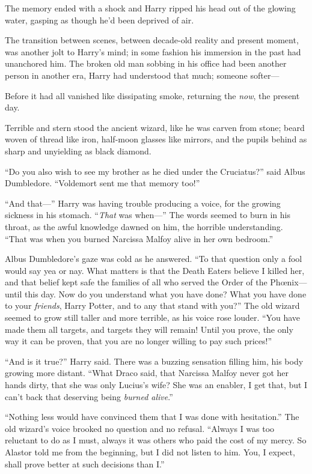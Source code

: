 \later

The memory ended with a shock and Harry ripped his head out of the glowing water, gasping as though he’d been deprived of air.

The transition between scenes, between decade-old reality and present moment, was another jolt to Harry’s mind; in some fashion his immersion in the past had unanchored him. The broken old man sobbing in his office had been another person in another era, Harry had understood that much; someone softer—

Before it had all vanished like dissipating smoke, returning the \emph{now}, the present day.

Terrible and stern stood the ancient wizard, like he was carven from stone; beard woven of thread like iron, half-moon glasses like mirrors, and the pupils behind as sharp and unyielding as black diamond.

“Do you also wish to see my brother as he died under the Cruciatus?” said Albus Dumbledore. “Voldemort sent me that memory too!”

“And that—” Harry was having trouble producing a voice, for the growing sickness in his stomach. “\emph{That} was when—” The words seemed to burn in his throat, as the awful knowledge dawned on him, the horrible understanding. “That was when you burned Narcissa Malfoy alive in her own bedroom.”

Albus Dumbledore’s gaze was cold as he answered. “To that question only a fool would say yea or nay. What matters is that the Death Eaters believe I killed her, and that belief kept safe the families of all who served the Order of the Phœnix—until this day. Now do you understand what you have done? What you have done to your \emph{friends}, Harry Potter, and to any that stand with you?” The old wizard seemed to grow still taller and more terrible, as his voice rose louder. “You have made them all targets, and targets they will remain! Until you prove, the only way it can be proven, that you are no longer willing to pay such prices!”

“And is it true?” Harry said. There was a buzzing sensation filling him, his body growing more distant. “What Draco said, that Narcissa Malfoy never got her hands dirty, that she was only Lucius’s wife? She was an enabler, I get that, but I can’t back that deserving being \emph{burned alive}.”

“Nothing less would have convinced them that I was done with hesitation.” The old wizard’s voice brooked no question and no refusal. “Always I was too reluctant to do as I must, always it was others who paid the cost of my mercy. So Alastor told me from the beginning, but I did not listen to him. You, I expect, shall prove better at such decisions than I.”

